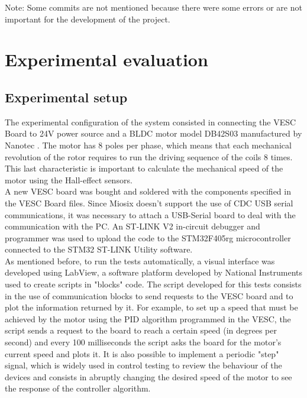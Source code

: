 Note: Some commits are not mentioned because there were some errors or are not important for the development of the project.\\

\pagebreak

\section{Experimental evaluation}
\subsection{Experimental setup}
The experimental configuration of the system consisted in connecting the VESC Board to 24V power source and a BLDC motor model DB42S03 manufactured by Nanotec \cite{BLDCMotorManual}. The motor has 8 poles per phase, which means that each mechanical revolution of the rotor requires to run the driving sequence of the coils 8 times. This last characteristic is important to calculate the mechanical speed of the motor using the Hall-effect sensors.\\

A new VESC board was bought and soldered with the components specified in the VESC Board files. Since Miosix doesn't support the use of CDC USB serial communications, it was necessary to attach a USB-Serial board to deal with the communication with the PC. An ST-LINK V2 in-circuit debugger and programmer was used to upload the code to the STM32F405rg microcontroller connected to the STM32 ST-LINK Utility software.\\

As mentioned before, to run the tests automatically, a visual interface was developed using LabView, a software platform developed by National Instruments used to create scripts in "blocks" code. The script developed for this tests consists in the use of communication blocks to send requests to the VESC board and to plot the information returned by it. For example, to set up a speed that must be achieved by the motor using the PID algorithm programmed in the VESC, the script sends a request to the board to reach a certain speed (in degrees per second) and every 100 milliseconds the script asks the board for the motor's current speed and plots it. It is also possible to implement a periodic "step" signal, which is widely used in control testing to review the behaviour of the devices and consists in abruptly changing the desired speed of the motor to see the response of the controller algorithm.\\

